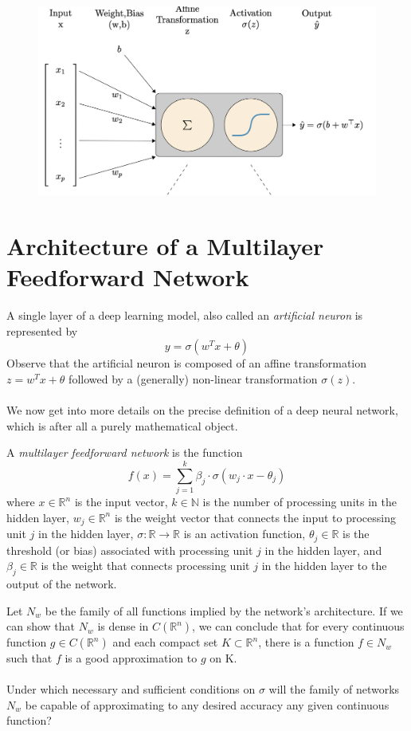 \documentclass[../main.tex]{subfiles}
\begin{document}
\begin{figure}[h]
	\centering
	\includegraphics[width=0.6\linewidth]{imgs/neu}
\end{figure} \mbox{} \par
	
	
	\section{Architecture of a Multilayer Feedforward Network}

	\noindent A single layer of a deep learning model, also called an\textit{ artificial neuron }is represented by $$ y=\sigma(w^Tx + \theta) $$
Observe that the artificial neuron is composed of an affine transformation $ z=w^Tx + \theta$ followed by a (generally) non-linear transformation $\sigma(z)$. \\ \\ 
		\noindent  We now get into more details on the precise definition of a deep neural network, which is after all a purely mathematical object. 
	\begin{definition} A \textit{multilayer feedforward network} is the function
		$$f(x)=\sum_{j=1}^k \beta_j \cdot \sigma(w_j \cdot x - \theta_j)$$
		where $x \in \mathbb{R}^n$ is the input vector, $k \in \mathbb{N}$ is the number of processing units in the hidden layer, $w_j \in \mathbb{R}^n$ is the weight vector that connects the input to processing unit $j$ in the hidden layer, $\sigma : \mathbb{R} \rightarrow \mathbb{R}$ is an activation function, $\theta_j \in \mathbb{R}$ is the threshold (or bias) associated with processing unit $j$ in the hidden layer, and $\beta_j \in \mathbb{R}$ is the weight that connects processing unit $j$ in the hidden layer to the output of the network.
		
		
	\end{definition}

	\noindent Let $N_{w}$ be the family of all functions implied by the network's architecture.  If we can show that $N_{w}$ is dense in $C(\mathbb{R}^n)$, we can conclude that for every continuous function $g \in C(\mathbb{R}^n) $ and each compact set $K \subset \mathbb{R}^n$, there is a function $f \in N_{w}$ such that $f$ is a good approximation to $g$ on K. \\ \\
	\noindent Under which necessary and sufficient conditions on $\sigma$ will the family of networks $N_w$ be capable of approximating to any desired accuracy any given continuous function?
	
	
\end{document}
